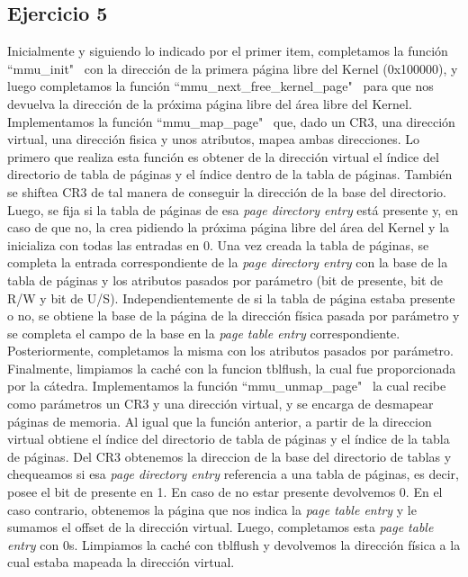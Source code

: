 \documentclass[a4paper]{article}
\begin{document}
\subsection{Ejercicio 5}
\justify
Inicialmente y siguiendo lo indicado por el primer item, completamos la función ``mmu_init" \ con la dirección de la primera página libre del Kernel (0x100000), y luego completamos la función ``mmu_next_free_kernel_page" \ para que nos devuelva la dirección de la próxima página libre del área libre del Kernel.
\justify
Implementamos la función ``mmu_map_page" \ que, dado un CR3, una dirección virtual, una dirección fisica y unos atributos, mapea ambas direcciones. Lo primero que realiza esta función es obtener de la dirección virtual el índice del directorio de tabla de páginas y el índice dentro de la tabla de páginas. También se shiftea CR3 de tal manera de conseguir la dirección de la base del directorio. Luego, se fija si la tabla de páginas de esa \textit{page directory entry} está presente y, en caso de que no, la crea pidiendo la próxima página libre del área del Kernel y la inicializa con todas las entradas en 0. Una vez creada la tabla de páginas, se completa la entrada correspondiente de la \textit{page directory entry} con la base de la tabla de páginas y los atributos pasados por parámetro (bit de presente, bit de R/W y bit de U/S). Independientemente de si la tabla de página estaba presente o no, se obtiene la base de la página de la dirección física pasada por parámetro y se completa el campo de la base en la \textit{page table entry} correspondiente. Posteriormente, completamos la misma con los atributos pasados por parámetro. Finalmente, limpiamos la caché con la funcion tblflush, la cual fue proporcionada por la cátedra.
\justify
Implementamos la función ``mmu_unmap_page" \, la cual recibe como parámetros un CR3 y una dirección virtual, y se encarga de desmapear páginas de memoria. Al igual que la función anterior, a partir de la direccion virtual obtiene el índice del directorio de tabla de páginas y el índice de la tabla de páginas. Del CR3 obtenemos la direccion de la base del directorio de tablas y chequeamos si esa \textit{page directory entry} referencia a una tabla de páginas, es decir, posee el bit de presente en 1. En caso de no estar presente devolvemos 0. En el caso contrario, obtenemos la página que nos indica la \textit{page table entry} y le sumamos el offset de la dirección virtual. Luego, completamos esta \textit{page table entry} con 0s. Limpiamos la caché con tblflush y devolvemos la dirección física a la cual estaba mapeada la dirección virtual.
\end{document}

